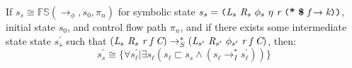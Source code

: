 % 
%

\begin{lemma}
\label{lem:init}
If $s_s \cong \mathbb{FS}(\rightarrow_{\phi},s_0,\pi_n)$ for symbolic state $s_s = \lp \cfgnt{L}_s\ \cfgnt{R}_{s}\ \phi_s\ \eta\ \cfgnt{r}\ \lp \cfgt{*}\ \cfgt{\$}\ \cfgnt{f} \rightarrow \cfgnt{k}\rp \rp$, initial state $s_0$, and control flow path $\pi_n$, and if there exists some intermediate state state $s_s^\prime$ such that $(\cfgnt{L}_s\ \cfgnt{R}_{s}\ \cfgnt{r}\ \cfgnt{f} \ \cfgnt{C}) \rightarrow_S^* (\cfgnt{L}_{s^\prime}\ \cfgnt{R}_{s^\prime}\ \phi_{s^\prime}\ \cfgnt{r}\ \cfgnt{f} \ \cfgnt{C})$, then:
 $$s_s^\prime \cong \{\forall s_\ell^\prime | \exists s_\ell (s_\ell \sqsubset s_s \wedge (s_\ell \rightarrow_I^* s_\ell^\prime) ) \}$$
\end{lemma}

